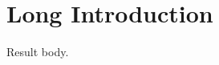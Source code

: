 \section[Short Intro]{Long Introduction}\label{sec:intro}
\begin{oblemma}\label{obs:main}
Result body.
\end{oblemma}
